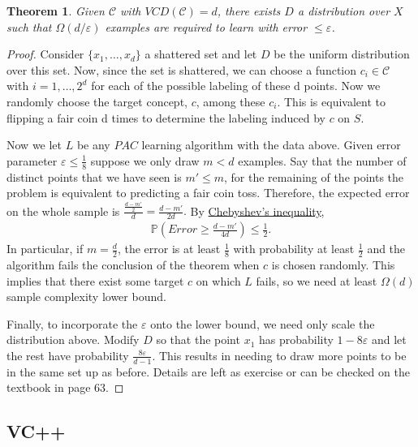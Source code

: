 \documentclass[12pt, letterpaper]{article}
\numberwithin{equation}{section} %
\newcommand{\mb}{\mathbb}
\newcommand{\mc}{\mathcal}
\newcommand{\ve}{\varepsilon}
\newtheorem{theorem}{Theorem}[section]
\theoremstyle{definition}
\theoremstyle{remark}
\begin{document}
\begin{theorem}
    Given $\mc C$ with $VCD(\mc C)=d$, there exists $D$ a distribution over $X$ such that $\Omega(d/\ve)$ examples are required to learn with error $\leq \ve$.
\end{theorem}
\begin{proof}
    Consider $\lbrace x_1,\ldots,x_d\rbrace$ a shattered set and let $D$ be the uniform distribution over this set. Now, since the set is shattered, we can choose a function $c_i\in \mc C$ with $i=1,\ldots,2^d$  for each of the possible labeling of these d points. Now we randomly choose the target concept, $c$, among these $c_i$. This is equivalent to flipping a fair coin d times to determine the labeling induced by $c$ on $S$.

    Now we let $L$ be any $PAC$ learning algorithm with the data above. Given error parameter $\ve \leq \frac18$ suppose we only draw $m < d$ examples. Say that the number of distinct points that we have seen is $m' \leq m$,  for the remaining of the points the problem is equivalent to predicting a fair coin toss. Therefore, the expected error on the whole sample is $\frac{\frac{d-m'}2}d = \frac{d-m'}{2d}.$ By \href{https://en.wikipedia.org/wiki/Markov's_inequality}{Chebyshev's inequality},
    \begin{align}
        \mb P\left(Error\geq \frac{d-m'}{4d}\right) \leq \frac12.
    \end{align}
    In particular, if $m=\frac d2$, the error is at least $\frac 18$ with probability at least $\frac 12$ and the algorithm fails the conclusion of the theorem when $c$ is chosen randomly. This implies that there exist some target $c$ on which $L$ fails, so we need at least $\Omega(d)$ sample complexity lower bound.

    Finally, to incorporate the $\ve$ onto the lower bound, we need only scale the distribution above. Modify $D$ so that  the point $x_1$ has  probability $1-8\ve$ and let the rest have probability $\frac{8\ve}{d-1}$. This results in needing to draw more points to be in the same set up as before. Details are left as exercise or can be checked on the textbook in page 63.
\end{proof}
\subsection{VC++}
\end{document}
